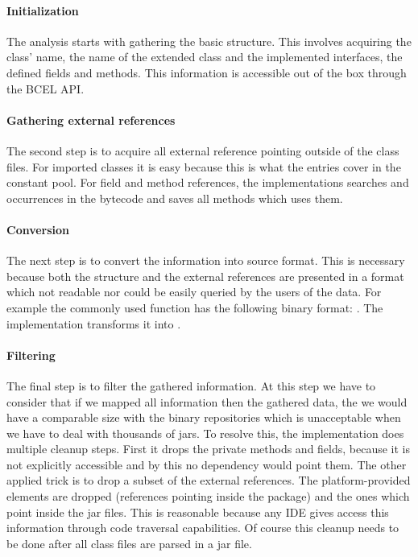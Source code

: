 \paragraph{Initialization}
The analysis starts with gathering the basic structure. This involves acquiring
the class' name, the name of the extended class and the implemented interfaces,
the defined fields and methods. This information is accessible out of the box
through the BCEL API.  

\paragraph{Gathering external references}
The second step is to acquire all external reference pointing outside of the
class files. For imported classes it is easy because this is what the
 entries cover in the constant pool. For field and method
references, the implementations searches  and
 occurrences in the bytecode and saves all methods 
which uses them.

\paragraph{Conversion}
The next step is to convert the information into source format. This is
necessary because both the structure and the external references are presented
in a format which not readable nor could be easily queried by the users of the
data. For example the commonly used  function has the
following binary format: . The implementation
transforms it into  .

\paragraph{Filtering}
The final step is to filter  the gathered information. At this step we have to
consider that if we mapped all information then the gathered data, the we would have a
comparable size with the binary repositories which is unacceptable when we have
to deal with thousands of jars. To resolve this, the implementation does
multiple cleanup steps. First it drops the private methods and fields, because
it is not explicitly accessible and by this no dependency would point them. The
other applied trick is to drop a subset of the external references. The
platform-provided elements are dropped (references pointing inside the
 package) and the ones which point inside the jar files. This is
reasonable because any IDE gives access this information through code traversal
capabilities. Of course this cleanup needs to be done after all class files are 
parsed in a jar file. 


